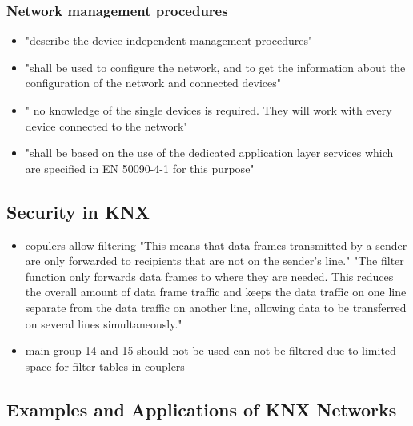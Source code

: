 \subsubsection{Network management procedures}
	\begin{itemize}
		\item "describe the device independent management procedures" \parencite{DIN_EN_50090-7-1}
		\item "shall be used to configure the network, and to get the information about the configuration of the network and connected devices" \parencite{DIN_EN_50090-7-1}
		\item " no knowledge of the single devices is required. They will work with every device connected to the network" \parencite{DIN_EN_50090-7-1}
		\item "shall be based on the use of the dedicated application layer services which are specified in EN 50090-4-1 \parencite{DIN_EN_50090-4-1} for this purpose" \parencite{DIN_EN_50090-7-1}
	\end{itemize}
	
\subsection{Security in KNX}
	\begin{itemize}
		\item copulers allow filtering 
			\subitem "This means that data frames transmitted by a sender are only forwarded to recipients that are not on the sender’s line." \parencite{Merz2009}
			\subitem "The filter function only forwards data frames to where they are needed. This reduces the overall amount of data frame traffic and keeps the data traffic on one line separate from the data traffic on another line, allowing data to be transferred on several lines simultaneously." \parencite{Merz2009}
		\item main group 14 and 15 should not be used \parencite{Hubner2009}
			\subitem can not be filtered due to limited space for filter tables in couplers \parencite{Hubner2009}
			
			
	\end{itemize}

\subsection{Examples and Applications of KNX Networks}

\section{\lonworks}

\section{\bacnet}